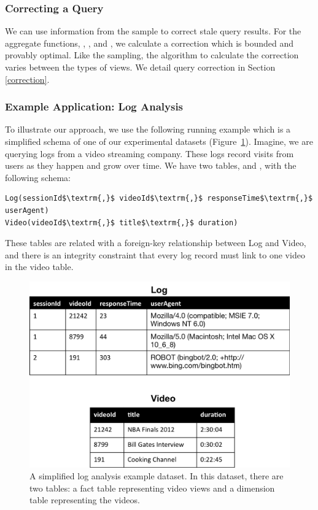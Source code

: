 \subsubsection{Correcting a Query}
We can use information from the sample to correct stale query results.
For the aggregate functions, \sumfunc, \countfunc, and \avgfunc, we calculate a correction
which is bounded and provably optimal.
Like the sampling, the algorithm to calculate the correction varies between the types of views.
We detail query correction in Section \ref{correction}.

\subsubsection{Example Application: Log Analysis}
To illustrate our approach, we use the following running example which is a 
simplified schema of one of our experimental datasets (Figure~\ref{example-1}).
Imagine, we are querying logs from a video streaming company. 
These logs record visits from users as they happen and grow over time.
We have two tables,  and , with the following schema:

\begin{lstlisting}[mathescape]
Log(sessionId$\textrm{,}$ videoId$\textrm{,}$ responseTime$\textrm{,}$ userAgent)
Video(videoId$\textrm{,}$ title$\textrm{,}$ duration)
\end{lstlisting}
These tables are related with a foreign-key relationship between
Log and Video, and there is an integrity constraint that every log
record must link to one video in the video table.

\begin{figure}[t] 
\centering
 \includegraphics[scale=0.33]{figs/sample-clean-example.png}
 \caption{A simplified log analysis example dataset. In this dataset, there are two tables: a fact table representing video views and a dimension table representing the videos.\label{example-1}}
\end{figure}

